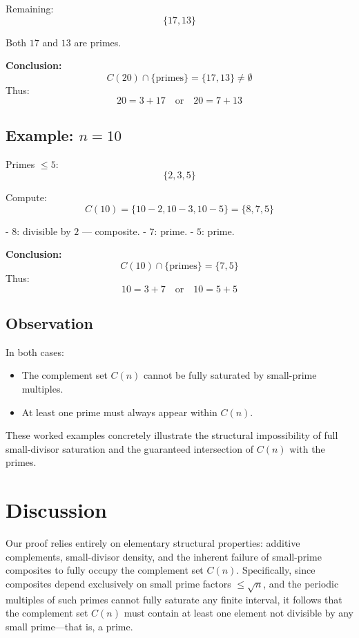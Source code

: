 \documentclass[11pt]{article}
\begin{document}
	Remaining:
	\[
	\{17, 13\}
	\]
	
	Both \( 17 \) and \( 13 \) are primes.
	
	\textbf{Conclusion:}
	\[
	C(20) \cap \{\text{primes}\} = \{17, 13\} \neq \emptyset
	\]
	Thus:
	\[
	20 = 3 + 17 \quad \text{or} \quad 20 = 7 + 13
	\]
	
	\subsection*{Example: \( n = 10 \)}
	
	Primes \( \leq 5 \):
	\[
	\{2, 3, 5\}
	\]
	
	Compute:
	\[
	C(10) = \{10 - 2, 10 - 3, 10 - 5\} = \{8, 7, 5\}
	\]
	
	- \( 8 \): divisible by \( 2 \) — composite.
	- \( 7 \): prime.
	- \( 5 \): prime.
	
	\textbf{Conclusion:}
	\[
	C(10) \cap \{\text{primes}\} = \{7, 5\}
	\]
	Thus:
	\[
	10 = 3 + 7 \quad \text{or} \quad 10 = 5 + 5
	\]
	
	\subsection*{Observation}
	
	In both cases:
	\begin{itemize}
		\item The complement set \( C(n) \) cannot be fully saturated by small-prime multiples.
		\item At least one prime must always appear within \( C(n) \).
	\end{itemize}
	
	These worked examples concretely illustrate the structural impossibility of full small-divisor saturation and the guaranteed intersection of \( C(n) \) with the primes.

		
	\section{Discussion}
	
	Our proof relies entirely on elementary structural properties: additive complements, small-divisor density, and the inherent failure of small-prime composites to fully occupy the complement set \( C(n) \). Specifically, since composites depend exclusively on small prime factors \( \leq \sqrt{n} \), and the periodic multiples of such primes cannot fully saturate any finite interval, it follows that the complement set \( C(n) \) must contain at least one element not divisible by any small prime—that is, a prime.
	
\end{document}

